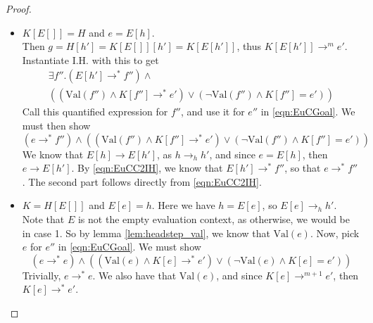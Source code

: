 \documentclass[twoside,11pt,openright]{report}
\theoremstyle{definition}
\newcommand{\expr}{e}
\newcommand{\elctx}{K}
\newcommand{\step}{\rightarrow}
\newcommand{\stepS}{\rightarrow^*}
\newcommand{\hstep}{\rightarrow_h}
\newcommand{\Val}[1]{\mathrm{Val}(#1)}
\begin{document}
\begin{proof}
\begin{itemize}
\begin{itemize}
      \item $\elctx[E[]] = H$ and $\expr = E[h]$.\\
        Then $g = H[h'] = \elctx[E[]][h'] = \elctx[E[h']]$, thus $\elctx[E[h']] \step^m \expr'$. Instantiate I.H. with this to get
        \begin{multline}\label{eqn:EuCC2IH}
          \exists f'' . (E[h'] \stepS f'') \land\\
          \left((\Val{f''} \land \elctx[f''] \stepS \expr') \lor
          (\neg \Val{f''} \land \elctx[f''] = \expr') \right)
        \end{multline}
        Call this quantified expression for $f''$, and use it for $\expr''$ in \ref{eqn:EuCGoal}. We must then show
        \begin{equation*}
          (\expr \stepS f'') \land 
          \left( (\Val{f''} \land \elctx[f''] \stepS \expr') \lor
          (\neg \Val{f''} \land \elctx[f''] = \expr') \right)
        \end{equation*}
        We know that $E[h] \step E[h']$, as $h \hstep h'$, and since $\expr = E[h]$, then $\expr \step E[h']$. By 
        \ref{eqn:EuCC2IH}, we know that $E[h'] \stepS f''$, so that $\expr \stepS f''$. The second part follows directly from \ref{eqn:EuCC2IH}.

      \item $\elctx = H[E[]]$ and $E[\expr] = h$.
        Here we have $h = E[\expr]$, so $E[\expr] \hstep h'$. Note that $E$ is not the empty evaluation context, as otherwise, we would be in case 1. So by lemma \ref{lem:headstep_val}, we know that $\Val{\expr}$. Now, pick $\expr$ for $\expr''$ in \ref{eqn:EuCGoal}. We must show 
        \begin{equation*}
          (\expr \stepS \expr) \land 
          \left( (\Val{\expr} \land \elctx[\expr] \stepS \expr') \lor
          (\neg \Val{\expr} \land \elctx[\expr] = \expr') \right)
        \end{equation*}
        Trivially, $\expr \stepS \expr$. We also have that $\Val{\expr}$, and since $\elctx[\expr] \step^{m + 1} \expr'$, then $\elctx[\expr] \stepS \expr'$.
    \end{itemize}
  \end{itemize}
\end{proof}
\end{document}
